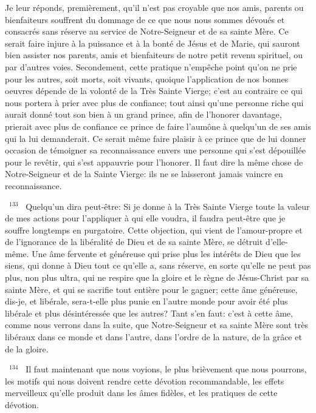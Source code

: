 \documentclass[paper=a5,pagesize=pdftex,fontsize=15pt,headinclude=on,twoside=off]{scrbook}
\newcommand{\negphantom}[1]{\settowidth{\dimen0}{#1}\hspace*{-\dimen0}}
\newcommand{\versenb}[1]{\par \vspace{10pt}~\negphantom{~${}^{#1}$~}${}^{#1}$~}
\begin{document}
Je leur réponds, premièrement, qu'il n'est pas croyable que nos amis, parents ou bienfaiteurs souffrent du
dommage de ce que nous nous sommes dévoués et consacrés sans réserve au service de Notre-Seigneur et de
sa sainte Mère. Ce serait faire injure à la puissance et à la bonté de Jésus et de Marie, qui sauront bien assister
nos parents, amis et bienfaiteurs de notre petit revenu spirituel, ou par d'autres voies.
Secondement, cette pratique n'empêche point qu'on ne prie pour les autres, soit morts, soit vivants, quoique
l'application de nos bonnes oeuvres dépende de la volonté de la Très Sainte Vierge; c'est au contraire ce qui nous
portera à prier avec plus de confiance; tout ainsi qu'une personne riche qui aurait donné tout son bien à un grand
prince, afin de l'honorer davantage, prierait avec plus de confiance ce prince de faire l'aumône à quelqu'un de ses
amis qui la lui demanderait. Ce serait même faire plaisir à ce prince que de lui donner occasion de témoigner sa
reconnaissance envers une personne qui s'est dépouillée pour le revêtir, qui s'est appauvrie pour l'honorer. Il faut
dire la même chose de Notre-Seigneur et de la Sainte Vierge: ils ne se laisseront jamais vaincre en
reconnaissance.
\versenb{133} Quelqu'un dira peut-être: Si je donne à la Très Sainte Vierge toute la valeur de mes actions pour l'appliquer à
qui elle voudra, il faudra peut-être que je souffre longtemps en purgatoire.
Cette objection, qui vient de l'amour-propre et de l'ignorance de la libéralité de Dieu et de sa sainte Mère, se détruit
d'elle-même. Une âme fervente et généreuse qui prise plus les intérêts de Dieu que les siens, qui donne à Dieu
tout ce qu'elle a, sans réserve, en sorte qu'elle ne peut pas plus, non plus ultra, qui ne respire que la gloire et le
règne de Jésus-Christ par sa sainte Mère, et qui se sacrifie tout entière pour le gagner; cette âme généreuse, dis-je, et libérale, sera-t-elle plus punie en l'autre monde pour avoir été plus libérale et plus désintéressée que les
autres? Tant s'en faut: c'est à cette âme, comme nous verrons dans la suite, que Notre-Seigneur et sa sainte Mère
sont très libéraux dans ce monde et dans l'autre, dans l'ordre de la nature, de la grâce et de la gloire.
\versenb{134} Il faut maintenant que nous voyions, le plus brièvement que nous pourrons, les motifs qui nous doivent
rendre cette dévotion recommandable, les effets merveilleux qu'elle produit dans les âmes fidèles, et les pratiques
de cette dévotion.
\end{document}
